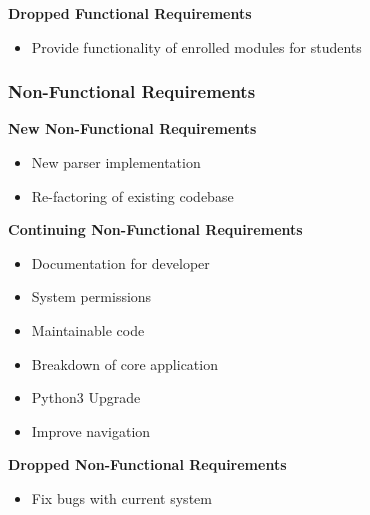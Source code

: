 	\textbf{Dropped Functional Requirements}
	\begin{itemize}
		\item Provide functionality of enrolled modules for students	
	\end{itemize}
		
	\subsubsection{Non-Functional Requirements}
	\textbf{New Non-Functional Requirements}
	\begin{itemize}
		\item New parser implementation
		\item Re-factoring of existing codebase
	\end{itemize}
	
	\textbf{Continuing Non-Functional Requirements}
	\begin{itemize}
		\item Documentation for developer
		\item System permissions
		\item Maintainable code
		\item Breakdown of core application
		\item Python3 Upgrade
		\item Improve navigation
	\end{itemize}
	
	\textbf{Dropped Non-Functional Requirements}
	\begin{itemize}
		\item Fix bugs with current system	
	\end{itemize}
	